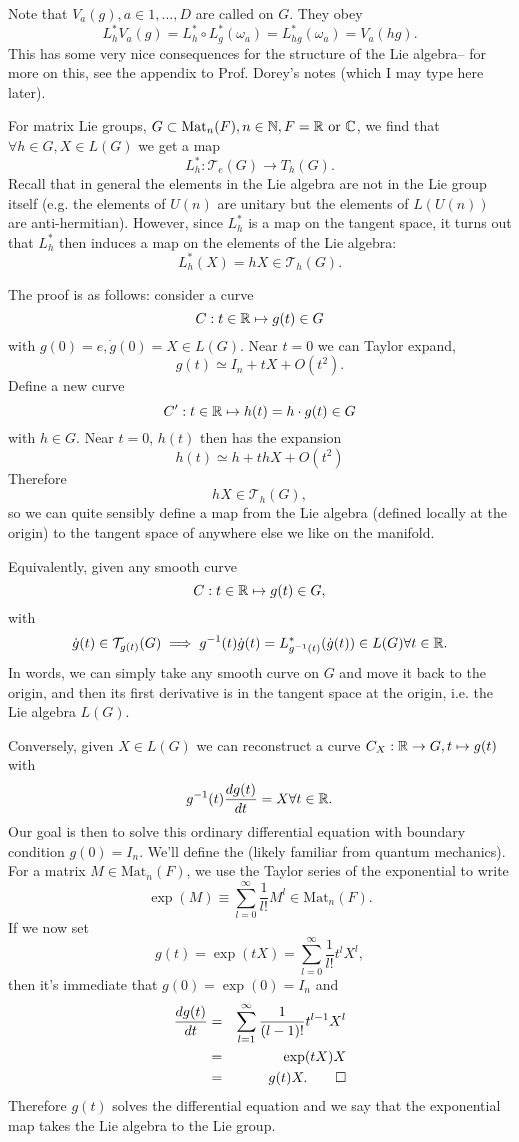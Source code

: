 \begin{defn}
Note that $V_a(g), a\in 1,\ldots,D$ are called  on $G$. They obey
$$L_h^*V_a(g)=L_h^* \circ L_g^*(\omega_a)=L_{hg}^*(\omega_a)=V_a(hg).$$
This has some very nice consequences for the structure of the Lie algebra-- for more on this, see the appendix to Prof. Dorey's notes (which I may type here later).
\end{defn}

For matrix Lie groups, $G\subset \text{Mat}_n(F), n\in \mathbb{N}, F=\mathbb{R}\text{ or }\mathbb{C}$, we find that $\forall h\in G, X\in L(G)$ we get a map
$$L_h^*: \mathcal{T}_e(G)\to T_h(G).$$
Recall that in general the elements in the Lie algebra are not in the Lie group itself (e.g. the elements of $U(n)$ are unitary but the elements of $L(U(n))$ are anti-hermitian). However, since $L_h^*$ is a map on the tangent space, it turns out that $L_h^*$ then induces a map on the elements of the Lie algebra:
$$L_h^*(X)=hX \in \mathcal{T}_h(G).$$

The proof is as follows: consider a curve
$$C:t\in \mathbb{R}\mapsto g(t)\in G$$
with $g(0)=e,\dot g(0)=X\in L(G)$. Near $t=0$ we can Taylor expand,
$$g(t)\simeq I_n+tX+O(t^2).$$
Define a new curve
$$C':t\in \mathbb{R} \mapsto h(t)=h \cdot g(t) \in G$$
with $h\in G$. Near $t=0$, $h(t)$ then has the expansion
$$h(t)\simeq h+thX + O(t^2)$$
Therefore $$hX\in \mathcal{T}_h(G),$$
so we can quite sensibly define a map from the Lie algebra (defined locally at the origin) to the tangent space of anywhere else we like on the manifold.

Equivalently, given any smooth curve
$$C:t\in \mathbb{R} \mapsto g(t)\in G,$$
with $$\dot g(t)\in \mathcal{T}_{g(t)}(G) \implies g^{-1}(t) \dot g(t)= L_{g^{-1}(t)}^* (\dot g(t))\in L(G) \forall t\in \mathbb{R}.$$ In words, we can simply take any smooth curve on $G$ and move it back to the origin, and then its first derivative is in the tangent space at the origin, i.e. the Lie algebra $L(G)$.

Conversely, given $X\in L(G)$ we can reconstruct a curve $C_X: \mathbb{R}\to G, t\mapsto g(t)$ with
$$g^{-1}(t)\frac{dg(t)}{dt}=X \forall t\in \mathbb{R}.$$
Our goal is then to solve this ordinary differential equation with boundary condition $g(0)=I_n.$ We'll define the  (likely familiar from quantum mechanics). For a matrix $M\in \text{Mat}_n(F)$, we use the Taylor series of the exponential to write
$$\exp(M)\equiv \sum_{l=0}^\infty \frac{1}{l!} M^l \in \text{Mat}_n(F).$$
If we now set 
$$g(t)=\exp(tX)= \sum_{l=0}^\infty \frac{1}{l!}t^l X^l,$$
then it's immediate that $g(0)=\exp(0)=I_n$ and
\begin{eqnarray*}
\frac{dg(t)}{dt}&=&\sum_{l=1}^\infty \frac{1}{(l-1)!}t^{l-1}X^l\\
&=&\exp(tX) X\\
&=&g(t) X. \qed
\end{eqnarray*}
Therefore $g(t)$ solves the differential equation and we say that the exponential map takes the Lie algebra to the Lie group.